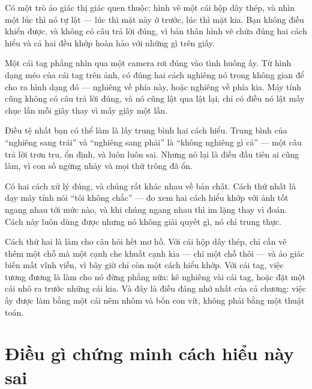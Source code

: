 \documentclass[../../marker.tex]{subfiles}
\begin{document}
\begin{dongian}
Có một trò ảo giác thị giác quen thuộc: hình vẽ một cái hộp dây thép, và nhìn một lúc thì nó tự lật --- lúc thì mặt này ở trước, lúc thì mặt kia. Bạn không điều khiển được, và không có câu trả lời đúng, vì bản thân hình vẽ chứa đúng hai cách hiểu và cả hai đều khớp hoàn hảo với những gì trên giấy.

Một cái tag phẳng nhìn qua một camera rơi đúng vào tình huống ấy. Từ hình dạng méo của cái tag trên ảnh, có đúng hai cách nghiêng nó trong không gian để cho ra hình dạng đó --- nghiêng về phía này, hoặc nghiêng về phía kia. Máy tính cũng không có câu trả lời đúng, và nó cũng lật qua lật lại, chỉ có điều nó lật mấy chục lần mỗi giây thay vì mấy giây một lần.

Điều tệ nhất bạn có thể làm là lấy trung bình hai cách hiểu. Trung bình của ``nghiêng sang trái'' và ``nghiêng sang phải'' là ``không nghiêng gì cả'' --- một câu trả lời trơn tru, ổn định, và luôn luôn sai. Nhưng nó lại là điều đầu tiên ai cũng làm, vì con số ngừng nhảy và mọi thứ trông đã ổn.

Có hai cách xử lý đúng, và chúng rất khác nhau về bản chất. Cách thứ nhất là dạy máy tính nói ``tôi không chắc'' --- đo xem hai cách hiểu khớp với ảnh tốt ngang nhau tới mức nào, và khi chúng ngang nhau thì im lặng thay vì đoán. Cách này luôn dùng được nhưng nó không giải quyết gì, nó chỉ trung thực.

Cách thứ hai là làm cho câu hỏi hết mơ hồ. Với cái hộp dây thép, chỉ cần vẽ thêm một chỗ mà một cạnh che khuất cạnh kia --- chỉ một chỗ thôi --- và ảo giác biến mất vĩnh viễn, vì bây giờ chỉ còn một cách hiểu khớp. Với cái tag, việc tương đương là làm cho nó đừng phẳng nữa: kê nghiêng vài cái tag, hoặc đặt một cái nhô ra trước những cái kia. Và đây là điều đáng nhớ nhất của cả chương: việc ấy được làm bằng một cái nêm nhôm và bốn con vít, không phải bằng một thuật toán.

\end{dongian}

\section{Điều gì chứng minh cách hiểu này sai}
\end{document}
